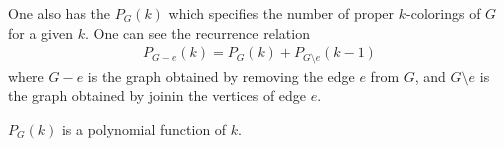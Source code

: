One also has the  $P_{G}(k)$ which specifies the number of proper $k$-colorings of $G$ for a given $k$. One can see the recurrence relation 
\begin{align}
    P_{G-e}(k) = P_{G}(k) + P_{G\setminus e}(k-1)
\end{align}
where $G-e$ is the graph obtained by removing the edge $e$ from $G$, and $G\setminus e$ is the graph obtained by joinin the vertices of edge $e$.

\begin{theorem}
    $P_{G}(k)$ is a polynomial function of $k$.
\end{theorem}
